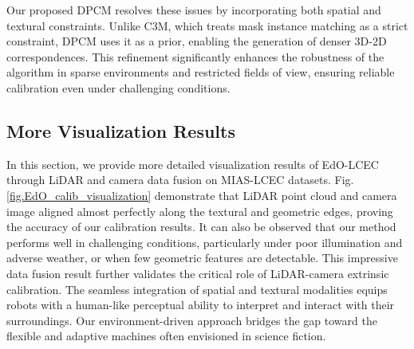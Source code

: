Our proposed DPCM resolves these issues by incorporating both spatial and textural constraints. Unlike C3M, which treats mask instance matching as a strict constraint, DPCM uses it as a prior, enabling the generation of denser 3D-2D correspondences. This refinement significantly enhances the robustness of the algorithm in sparse environments and restricted fields of view, ensuring reliable calibration even under challenging conditions.

\subsection{More Visualization Results}
\label{sec.more_visualization}

In this section, we provide more detailed visualization results of EdO-LCEC through LiDAR and camera data fusion on MIAS-LCEC datasets. Fig. \ref{fig.EdO_calib_visualization} demonstrate that LiDAR point cloud and camera image aligned almost perfectly along the textural and geometric edges, proving the accuracy of our calibration results. It can also be observed that our method performs well in challenging conditions, particularly under poor illumination and adverse weather, or when few geometric features are detectable. This impressive data fusion result further validates the critical role of LiDAR-camera extrinsic calibration. The seamless integration of spatial and textural modalities equips robots with a human-like perceptual ability to interpret and interact with their surroundings. Our environment-driven approach bridges the gap toward the flexible and adaptive machines often envisioned in science fiction.